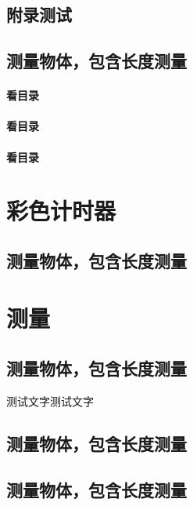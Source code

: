 \begin{Appendix}
	
\section{附录测试}
	
\end{Appendix}



\begin{Appendix*}

\section{测量物体，包含长度测量}

\subsubsection{看目录}

\subsubsection{看目录}

\subsubsection*{看目录}

\chapter{彩色计时器}

\section{测量物体，包含长度测量}

\chapter{测量}

\zhlipsum[1]

\section{测量物体，包含长度测量}

\begin{Example}
	测试文字测试文字
\end{Example}


\section{测量物体，包含长度测量}

\section{测量物体，包含长度测量}



\end{Appendix*}
